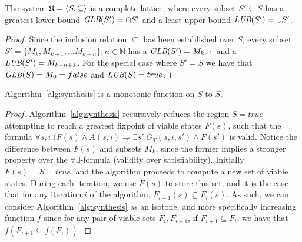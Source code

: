 \begin{lemma} The system $\mathfrak{U} = \langle S, \subseteq \rangle$ is a complete lattice, where every subset $S' \subseteq S$ has a greatest lower bound  $\textit {GLB}(S') = \cap S'$  and a least upper bound $\textit {LUB}(S') = \cup S'$.
\label{lem:altlattice}
\end{lemma}
\begin{proof}
Since the inclusion relation $\subseteq$ has been established over $S$, every subset $S' = \{M_k, M_{k+1}, \ldots M_{k+n}\}, n \in \mathbb{N}$ has a $\textit {GLB}(S') = M_{k-1}$ and a $\textit {LUB}(S') = M_{k+n+1}$. For the special case where $S' = S$ we have that $\textit {GLB}(S) = M_0 = false$ and $\textit {LUB}(S) = true$.
\end{proof}

\begin{lemma} Algorithm~\ref{alg:synthesis} is a monotonic function on $S$ to $S$.
\label{lm:altmonotonicity}
\end{lemma}
\begin{proof}
Algorithm~\ref{alg:synthesis} recursively reduces the region $S = true$ attempting to reach a greatest fixpoint of viable states $F(s)$, such that the formula $\forall s, i. (F(s) \land A(s,i) \Rightarrow \exists s'. G_T(s,i,s') \land F(s')$ is valid. Notice the difference between $F(s)$ and subsets $M_k$, since the former implies a stronger property over the $\forall\exists$-formula (validity over satisfiability). Initially $F(s) = S = true$, and the algorithm proceeds to compute a new set of viable states. During each iteration, we use $F(s)$ to store this set, and it is the case that for any iteration $i$ of the algorithm, $F_{i+1}(s) \subseteq F_{i}(s)$. As such, we can consider Algorithm~\ref{alg:synthesis} as an isotone, and more specifically increasing function $f$ since for any pair of viable sets $F_{i}, F_{i+1}$, if $F_{i+1} \subseteq F_{i}$, we have that $f(F_{i+1} \subseteq f(F_{i}))$.
\end{proof}

